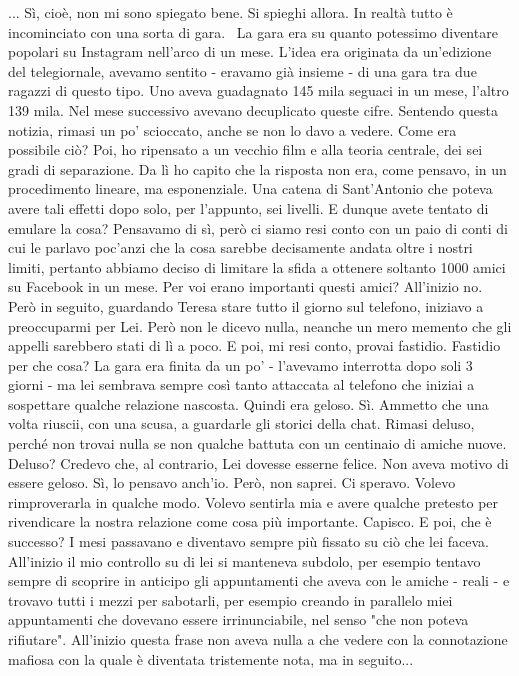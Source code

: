 \documentclass[a4paper,12pt]{article}
\newcommand{\Walter}{\speak{W}}
\newcommand{\Pollazzi}{\speak{P}}
\begin{document}
\begin{dialogue}
\Walter  ... Sì, cioè, non mi sono spiegato bene.
\Pollazzi Si spieghi allora.
\Walter  In realtà tutto è incominciato con una sorta di gara.  La gara era su quanto potessimo diventare popolari su Instagram nell'arco di un mese. L'idea era originata da un'edizione del telegiornale, avevamo sentito - eravamo già insieme - di una gara tra due ragazzi di questo tipo. Uno aveva guadagnato 145 mila seguaci in un mese, l'altro 139 mila. Nel mese successivo avevano decuplicato queste cifre. Sentendo questa notizia, rimasi un po' scioccato, anche se non lo davo a vedere. Come era possibile ciò? Poi, ho ripensato a un vecchio film e alla teoria centrale, dei sei gradi di separazione. Da lì ho capito che la risposta non era, come pensavo, in un procedimento lineare, ma esponenziale. Una catena di Sant'Antonio che poteva avere tali effetti dopo solo, per l'appunto, sei livelli.
\Pollazzi E dunque avete tentato di emulare la cosa?
\Walter  Pensavamo di sì, però ci siamo resi conto con un paio di conti di cui le parlavo poc’anzi che la cosa sarebbe decisamente andata oltre i nostri limiti, pertanto abbiamo deciso di limitare la sfida a ottenere soltanto 1000 amici su Facebook in un mese.
\Pollazzi Per voi erano importanti questi amici?
\Walter  All'inizio no. Però in seguito, guardando Teresa stare tutto il giorno sul telefono, iniziavo a preoccuparmi per Lei. Però non le dicevo nulla, neanche un mero memento che gli appelli sarebbero stati di lì a poco. E poi, mi resi conto, provai fastidio.
\Pollazzi Fastidio per che cosa?
\Walter  La gara era finita da un po' - l'avevamo interrotta dopo soli 3 giorni - ma lei sembrava sempre così tanto attaccata al telefono che iniziai a sospettare qualche relazione nascosta.
\Pollazzi Quindi era geloso.
\Walter  Sì. Ammetto che una volta riuscii, con una scusa, a guardarle gli storici della chat. Rimasi deluso, perché non trovai nulla se non qualche battuta con un centinaio di amiche nuove.
\Pollazzi Deluso? Credevo che, al contrario, Lei dovesse esserne felice. Non aveva motivo di essere geloso.
\Walter  Sì, lo pensavo anch'io. Però, non saprei. Ci speravo. Volevo rimproverarla in qualche modo. Volevo sentirla mia e avere qualche pretesto per rivendicare la nostra relazione come cosa più importante.
\Pollazzi Capisco. E poi, che è successo?
\Walter  I mesi passavano e diventavo sempre più fissato su ciò che lei faceva. All'inizio il mio controllo su di lei si manteneva subdolo, per esempio tentavo sempre di scoprire in anticipo gli appuntamenti che aveva con le amiche - reali - e trovavo tutti i mezzi per sabotarli, per esempio creando in parallelo miei appuntamenti che dovevano essere irrinunciabile, nel senso "che non poteva rifiutare". All'inizio questa frase non aveva nulla a che vedere con la connotazione mafiosa con la quale è diventata tristemente nota, ma in seguito...

\end{dialogue}
\end{document}
